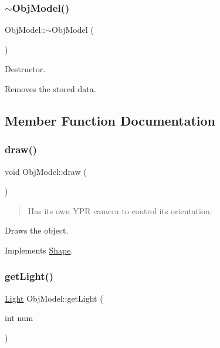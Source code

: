 \subsubsection{\texorpdfstring{$\sim$\+Obj\+Model()}{~ObjModel()}}
{\footnotesize\ttfamily Obj\+Model\+::$\sim$\+Obj\+Model (\begin{DoxyParamCaption}{ }\end{DoxyParamCaption})}



Destructor. 

Removes the stored data. 

\subsection{Member Function Documentation}
\mbox{\label{class_obj_model_aace5675f73bf6d839428a5ce9dbfeac3}} 
\subsubsection{\texorpdfstring{draw()}{draw()}}
{\footnotesize\ttfamily void Obj\+Model\+::draw (\begin{DoxyParamCaption}{ }\end{DoxyParamCaption})\hspace{0.3cm}{\ttfamily [virtual]}}



\begin{quote}
Has it\textquotesingle{}s own Y\+PR camera to control it\textquotesingle{}s orientation. \end{quote}


Draws the object. 

Implements \hyperlink{class_shape}{Shape}.

\mbox{\label{class_obj_model_adadab74f1605b3f1b6b778f6c78a8796}} 
\subsubsection{\texorpdfstring{get\+Light()}{getLight()}}
{\footnotesize\ttfamily \hyperlink{class_light}{Light} Obj\+Model\+::get\+Light (\begin{DoxyParamCaption}\item[{int}]{num }\end{DoxyParamCaption})}



